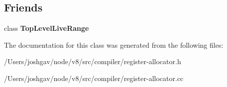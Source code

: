 \subsection*{Friends}
\begin{DoxyCompactItemize}
\item 
class {\bfseries Top\+Level\+Live\+Range}\hypertarget{classv8_1_1internal_1_1compiler_1_1_live_range_a129402ecd87e17260440c4799385799b}{}\label{classv8_1_1internal_1_1compiler_1_1_live_range_a129402ecd87e17260440c4799385799b}

\end{DoxyCompactItemize}


The documentation for this class was generated from the following files\+:\begin{DoxyCompactItemize}
\item 
/\+Users/joshgav/node/v8/src/compiler/register-\/allocator.\+h\item 
/\+Users/joshgav/node/v8/src/compiler/register-\/allocator.\+cc\end{DoxyCompactItemize}
